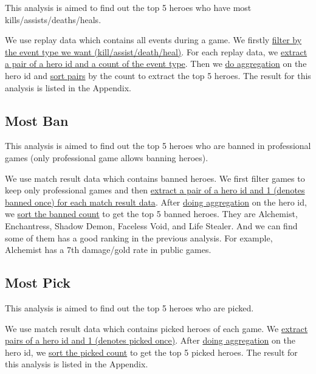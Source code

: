 \documentclass{article}
\begin{document}
This analysis is aimed to find out the top 5 heroes who have most kills/assists/deaths/heals.

We use replay data which contains all events during a game. We firstly \href{https://github.com/Vopaaz/big-data-psg-lgd/blob/master/src/main/scala/HeroMostStats.scala#L60}{filter by the event type we want (kill/assist/death/heal)}. For each replay data, we \href{https://github.com/Vopaaz/big-data-psg-lgd/blob/master/src/main/scala/HeroMostStats.scala#L61}{extract a pair of a hero id and a count of the event type}. Then we \href{https://github.com/Vopaaz/big-data-psg-lgd/blob/master/src/main/scala/HeroMostStats.scala#L62}{do aggregation} on the hero id and \href{https://github.com/Vopaaz/big-data-psg-lgd/blob/master/src/main/scala/HeroMostStats.scala#L65}{sort pairs} by the count to extract the top 5 heroes. The result for this analysis is listed in the Appendix.


\subsection{Most Ban}

This analysis is aimed to find out the top 5 heroes who are banned in professional games (only professional game allows banning heroes).

We use match result data which contains banned heroes. We first filter games to keep only professional games and then \href{https://github.com/Vopaaz/big-data-psg-lgd/blob/master/src/main/scala/MostBan.scala#L29-L30}{extract a pair of a hero id and 1 (denotes banned once) for each match result data}. After \href{https://github.com/Vopaaz/big-data-psg-lgd/blob/master/src/main/scala/MostBan.scala#L31}{doing aggregation} on the hero id, we \href{https://github.com/Vopaaz/big-data-psg-lgd/blob/master/src/main/scala/MostBan.scala#L33}{sort the banned count} to get the top 5 banned heroes. They are Alchemist, Enchantress, Shadow Demon, Faceless Void, and Life Stealer. And we can find some of them has a good ranking in the previous analysis. For example, Alchemist has a 7th damage/gold rate in public games.

\subsection{Most Pick}

This analysis is aimed to find out the top 5 heroes who are picked.

We use match result data which contains picked heroes of each game. We \href{https://github.com/Vopaaz/big-data-psg-lgd/blob/master/src/main/scala/MostPick.scala#L34}{extract pairs of a hero id and 1 (denotes picked once)}. After \href{https://github.com/Vopaaz/big-data-psg-lgd/blob/master/src/main/scala/MostPick.scala#L35}{doing aggregation} on the hero id, we \href{https://github.com/Vopaaz/big-data-psg-lgd/blob/master/src/main/scala/MostPick.scala#L37}{sort the picked count} to get the top 5 picked heroes. The result for this analysis is listed in the Appendix.
\end{document}
